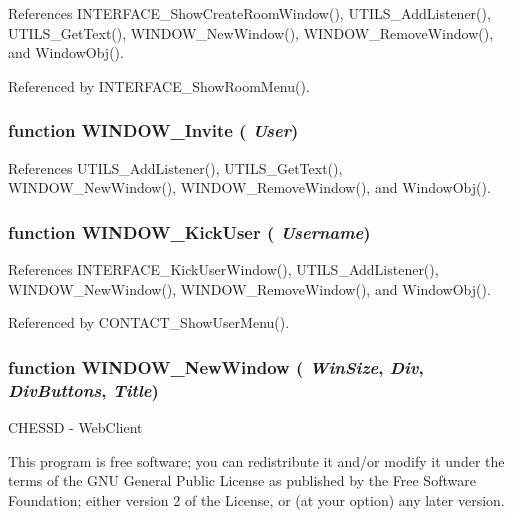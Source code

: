 References INTERFACE\_\-ShowCreateRoomWindow(), UTILS\_\-AddListener(), UTILS\_\-GetText(), WINDOW\_\-NewWindow(), WINDOW\_\-RemoveWindow(), and WindowObj().

Referenced by INTERFACE\_\-ShowRoomMenu().
\subsubsection{\setlength{\rightskip}{0pt plus 5cm}function WINDOW\_\-Invite ( {\em User})}\label{window_2window_8js_a0b254ab6a166342fef8e2ff561e155d}




References UTILS\_\-AddListener(), UTILS\_\-GetText(), WINDOW\_\-NewWindow(), WINDOW\_\-RemoveWindow(), and WindowObj().
\subsubsection{\setlength{\rightskip}{0pt plus 5cm}function WINDOW\_\-KickUser ( {\em Username})}\label{window_2window_8js_3290d97c970c392b43ddb909ff4215d4}




References INTERFACE\_\-KickUserWindow(), UTILS\_\-AddListener(), WINDOW\_\-NewWindow(), WINDOW\_\-RemoveWindow(), and WindowObj().

Referenced by CONTACT\_\-ShowUserMenu().
\subsubsection{\setlength{\rightskip}{0pt plus 5cm}function WINDOW\_\-NewWindow ( {\em WinSize}, \/   {\em Div}, \/   {\em DivButtons}, \/   {\em Title})}\label{window_2window_8js_ab201d1f7f6d972025e93c498a852ff8}


CHESSD - WebClient

This program is free software; you can redistribute it and/or modify it under the terms of the GNU General Public License as published by the Free Software Foundation; either version 2 of the License, or (at your option) any later version.

